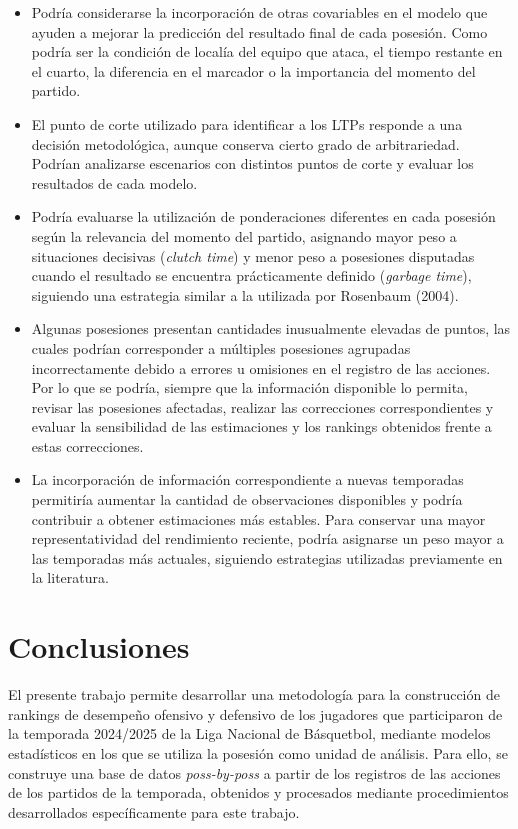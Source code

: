 \documentclass[
  12pt,
]{article}
\begin{document}
\begin{itemize}
\item
  Podría considerarse la incorporación de otras covariables en el modelo
  que ayuden a mejorar la predicción del resultado final de cada
  posesión. Como podría ser la condición de localía del equipo que
  ataca, el tiempo restante en el cuarto, la diferencia en el marcador o
  la importancia del momento del partido.
\item
  El punto de corte utilizado para identificar a los LTPs responde a una
  decisión metodológica, aunque conserva cierto grado de arbitrariedad.
  Podrían analizarse escenarios con distintos puntos de corte y evaluar
  los resultados de cada modelo.
\item
  Podría evaluarse la utilización de ponderaciones diferentes en cada
  posesión según la relevancia del momento del partido, asignando mayor
  peso a situaciones decisivas (\emph{clutch time}) y menor peso a
  posesiones disputadas cuando el resultado se encuentra prácticamente
  definido (\emph{garbage time}), siguiendo una estrategia similar a la
  utilizada por Rosenbaum (2004).
\item
  Algunas posesiones presentan cantidades inusualmente elevadas de
  puntos, las cuales podrían corresponder a múltiples posesiones
  agrupadas incorrectamente debido a errores u omisiones en el registro
  de las acciones. Por lo que se podría, siempre que la información
  disponible lo permita, revisar las posesiones afectadas, realizar las
  correcciones correspondientes y evaluar la sensibilidad de las
  estimaciones y los rankings obtenidos frente a estas correcciones.
\item
  La incorporación de información correspondiente a nuevas temporadas
  permitiría aumentar la cantidad de observaciones disponibles y podría
  contribuir a obtener estimaciones más estables. Para conservar una
  mayor representatividad del rendimiento reciente, podría asignarse un
  peso mayor a las temporadas más actuales, siguiendo estrategias
  utilizadas previamente en la literatura.
\end{itemize}

\newpage

\section{Conclusiones}\label{cap:conclusiones}

El presente trabajo permite desarrollar una metodología para la
construcción de rankings de desempeño ofensivo y defensivo de los
jugadores que participaron de la temporada 2024/2025 de la Liga Nacional
de Básquetbol, mediante modelos estadísticos en los que se utiliza la
posesión como unidad de análisis. Para ello, se construye una base de
datos \emph{poss-by-poss} a partir de los registros de las acciones de
los partidos de la temporada, obtenidos y procesados mediante
procedimientos desarrollados específicamente para este trabajo.
\end{document}
